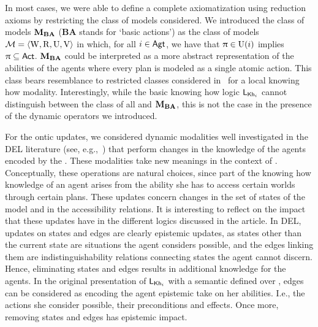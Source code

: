 \begin{mrevised}
In most cases, we were able to define a complete axiomatization using reduction axioms by restricting the class of models considered.  We introduced the class of models $\mathbf{M}_{\mathbf{BA}}$ (\textbf{BA} stands for `basic actions') as the class of models $\mathcal{M} = \langle \operatorname{W}, \operatorname{R}, \operatorname{U}, \operatorname{V} \rangle$ in which, for all $i \in {\rm \sf Agt}$, we have that $\uppi \in \operatorname{U}(i)$ implies $\uppi \subseteq {\rm \sf Act}$.  $\mathbf{M}_{\mathbf{BA}}$ could be interpreted as a more abstract representation of the abilities of the agents where every plan is modeled as a single atomic action.  This class bears resemblance to restricted classes considered in~\cite{Li21} for a local knowing how modality.
Interestingly, while the basic knowing how logic $\mathsf{L}_{{\sf Kh}_i}$ cannot distinguish between the class of all \ults and $\mathbf{M}_{\mathbf{BA}}$, this is not the case in the presence of the dynamic operators we introduced. 

For the ontic updates, we considered dynamic modalities well investigated in the DEL literature (see, e.g.,~\cite{Plaza89:lopc,KooiR11,DELbook}) that perform changes in the knowledge of the agents encoded by the \lts. These modalities take new meanings in the context of .  Conceptually, these operations are natural choices, since part of the knowing how knowledge of an agent arises from the ability she has to access certain worlds through certain plans.  These updates concern changes in the set of states of the model and in the accessibility relations.  It is interesting to reflect on the impact that these updates have in the different logics discussed in the article.  In DEL, updates on states and edges are clearly epistemic updates, as states other than the current state are situations the agent considers possible, and the edges linking them are indistinguishability relations connecting states the agent cannot discern.  Hence, eliminating states and edges results in additional knowledge for the agents.   In the original presentation of $\mathsf{L}_{{\sf Kh}_i}$ with a semantic defined over \lts, edges can be considered as encoding the agent epistemic take on her abilities.  I.e., the actions she consider possible, their preconditions and effects.  Once more, removing states and edges has epistemic impact.  



\end{mrevised}
